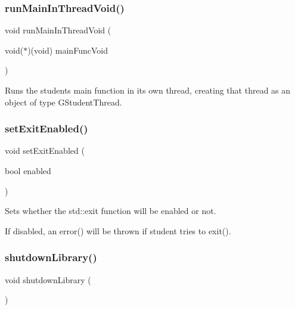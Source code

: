 \subsubsection{\texorpdfstring{run\+Main\+In\+Thread\+Void()}{runMainInThreadVoid()}}
{\footnotesize\ttfamily void run\+Main\+In\+Thread\+Void (\begin{DoxyParamCaption}\item[{void($\ast$)(void)}]{main\+Func\+Void }\end{DoxyParamCaption})}



Runs the student\textquotesingle{}s main function in its own thread, creating that thread as an object of type G\+Student\+Thread. 

\mbox{\label{namespacestanfordcpplib_afa57f85846177bb4ed2b4b12fa8a758d}} 
\subsubsection{\texorpdfstring{set\+Exit\+Enabled()}{setExitEnabled()}}
{\footnotesize\ttfamily void set\+Exit\+Enabled (\begin{DoxyParamCaption}\item[{bool}]{enabled }\end{DoxyParamCaption})}



Sets whether the std\+::exit function will be enabled or not. 

If disabled, an error() will be thrown if student tries to exit(). \mbox{\label{namespacestanfordcpplib_a2937cb1c4385064875d0cb29fcdfeae6}} 
\subsubsection{\texorpdfstring{shutdown\+Library()}{shutdownLibrary()}}
{\footnotesize\ttfamily void shutdown\+Library (\begin{DoxyParamCaption}{ }\end{DoxyParamCaption})}



